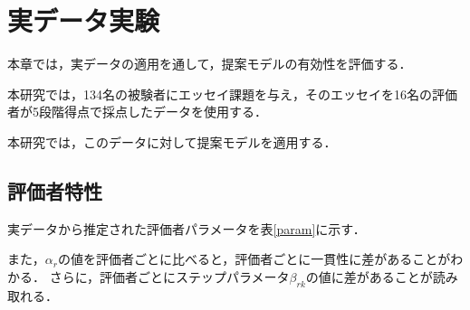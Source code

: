\documentclass[a4paper,11pt,oneside,openany]{jsbook}
\begin{document}
\newpage
\chapter{実データ実験}
本章では，実データの適用を通して，提案モデルの有効性を評価する．

本研究では，134名の被験者にエッセイ課題を与え，そのエッセイを16名の評価者が5段階得点で採点したデータを使用する．

本研究では，このデータに対して提案モデルを適用する．
\section{評価者特性}
実データから推定された評価者パラメータを表\ref{param}に示す．


また，$\alpha_r$の値を評価者ごとに比べると，評価者ごとに一貫性に差があることがわかる．
さらに，評価者ごとにステップパラメータ$\beta_{rk}$の値に差があることが読み取れる．
\end{document}
